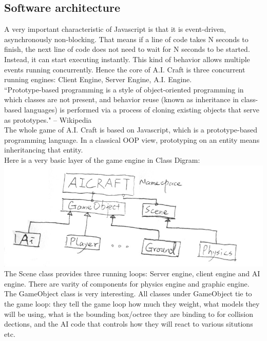 \documentclass[12pt]{article}
\begin{document}
\subsection{Software architecture}

A very important characteristic of Javascript is that it is event-driven, asynchronously non-blocking. That means if a line of code takes N seconds to finish, the next line of code does not need to wait for N seconds to be started. Instead, it can start executing instantly. This kind of behavior allows multiple events running concurrently. Hence the core of A.I. Craft is three concurrent running engines: Client Engine, Server Engine, A.I. Engine.\\

``Prototype-based programming is a style of object-oriented programming in which classes are not present, and behavior reuse (known as inheritance in class-based languages) is performed via a process of cloning existing objects that serve as prototypes." -- Wikipedia\\

The whole game of A.I. Craft is based on Javascript, which is a prototype-based programming language. In a classical OOP view, prototyping on an entity means inheritancing that entity.\\

Here is a very basic layer of the game engine in Class Digram:\\

\includegraphics[scale=0.4]{uml.jpg}\\

The Scene class provides three running loops: Server engine, client engine and AI engine. There are varity of components for physics engine and graphic engine. The GameObject class is very interesting. All classes under GameObject tie to the game loop: they tell the game loop how much they weight, what models they will be using, what is the bounding box/octree they are binding to for collision dections, and the AI code that controls how they will react to various situtions etc.\\
\end{document}
